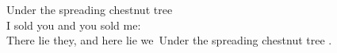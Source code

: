 

\newpage \vspace*{8cm}
\begin{center}
\large Under the spreading chestnut tree\\
I sold you and you sold me:\\
There lie they, and here lie we\
Under the spreading chestnut tree \autocite[1]{CloudNativ:1}.

\vspace{0.5cm}
\end{center}


\newpage